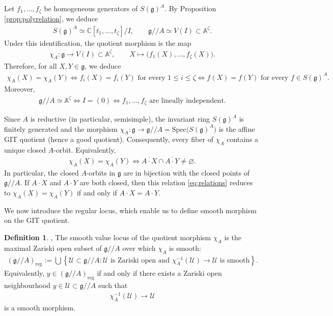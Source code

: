 \documentclass[11pt,reqno]{amsart}
\newtheorem*{theorem A}{Main Theorem A}
\newtheorem*{theorem B}{Main Theorem B}
\newtheorem*{theorem C}{Main Theorem C}
\newtheorem*{theorem D}{Main Theorem D}
\theoremstyle{definition}
\newtheorem{definition}[theorem]{Definition}
\theoremstyle{plain}
\theoremstyle{conclusion}
\begin{document}
Let $f_1, \ldots, f_\zeta$ be homogeneous generators of $S(\mathfrak{g})^A$. By Proposition \ref{prop:polyrelation}, we deduce \begin{align*}
S(\mathfrak{g})^A\simeq\mathbb{C} [t_1,\ldots,t_\zeta]/I,\qquad \mathfrak{g}//A\simeq V(I)\subset\mathbb{A} ^\zeta. 
\end{align*} Under this identification, the quotient morphism is the map\begin{align*}
\chi_A:\mathfrak{g}\longrightarrow V(I)\subset\mathbb{A} ^\zeta,\qquad X\longmapsto\bigl(f_1(X),\ldots,f_\zeta(X)\bigr). 
\end{align*} Therefore, for all $X,Y\in\mathfrak{g}$,  we deduce \begin{align*} 
\chi_A(X) = \chi_A(Y)\Longleftrightarrow f_i(X) = f_i(Y)\text{ for every }1 \leq i\leq \zeta \Longleftrightarrow f(X) = f(Y)\text{ for every } f \in S(\mathfrak{g})^A. 
\end{align*} Moreover, \begin{align*} 
\mathfrak{g}//A\simeq\mathbb{A} ^\zeta\Longleftrightarrow I=(0)\Longleftrightarrow f_1,\ldots,f_\zeta\text{ are lineally independent}.
\end{align*}

Since $A$ is reductive (in particular, semisimple), the invariant ring $S(\mathfrak{g})^A$ is finitely generated and the morphism $\chi_A:\mathfrak{g}\to\mathfrak{g}//A=\mathrm{Spec}\bigl(S(\mathfrak{g})^A\bigr)$ is the affine GIT quotient (hence a good quotient). Consequently, every fiber of $\chi_A$ contains a unique closed $A$-orbit. Equivalently, \begin{align} 
\chi_A(X) = \chi_A(Y)\Longleftrightarrow \overline{A\cdot X}\cap\overline{A\cdot Y}\neq\varnothing. \label{eq:relations}
\end{align} In particular, the closed $A$-orbits in $\mathfrak{g}$ are in bijection with the closed points of $\mathfrak{g}//A$. If $A\cdot X$ and $A\cdot Y$ are both closed, then this relation \eqref{eq:relations} reduces to $\chi_A(X)= \chi_A(Y)$ if and only if $A\cdot X = A\cdot Y$. 

We now introduce the regular locus, which enable us to define smooth morphism on the GIT quotient.
\begin{definition} 
\label{def:regularstr} \cite[Chapter 1, Section 5]{HartshorneAG}, \cite{stacks01V4}
The smooth value locus of the quotient morphism $\chi_A$ is the maximal Zariski open subset of $\mathfrak{g} //A$ over which $\chi_A$ is smooth: \begin{align}
    (\mathfrak{g} //A)_{\mathrm{reg}}  := \bigcup    \left\{   \mathcal{U} \subset \mathfrak{g} //A :   \mathcal{U} \text{ is Zariski open and }     \chi_A^{-1}(\mathcal{U})\to \mathcal{U} \text{ is smooth}  \right\}.
\end{align} Equivalently, $y\in(\mathfrak{g} //A)_{\mathrm{reg}}$ if and only if there exists a Zariski open neighbourhood $y\in \mathcal{U}\subset \mathfrak{g} //A$ such that \begin{align*}
    \chi_A^{-1}(\mathcal{U})\longrightarrow \mathcal{U}
\end{align*} is a smooth morphism.
\end{definition}
\end{document}
